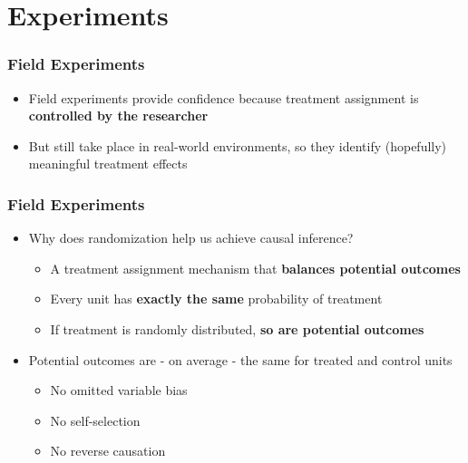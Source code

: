 \documentclass[xcolor=x11names,compress]{beamer}\usepackage[]{graphicx}\usepackage[]{color}
\renewcommand{\(}{\begin{columns}}
\renewcommand{\)}{\end{columns}}
\newcommand{\<}[1]{\begin{column}{#1}}
\renewcommand{\>}{\end{column}}
\begin{document}
\section{Experiments}

\begin{frame} 
\frametitle{Field Experiments}
\begin{itemize}
\item Field experiments provide confidence because treatment assignment is \textbf{controlled by the researcher}
\item But still take place in real-world environments, so they identify (hopefully) meaningful treatment effects
\end{itemize}
\end{frame}

\begin{frame}
\frametitle{Field Experiments}
\begin{itemize}
\item Why does randomization help us achieve causal inference?
\pause
\begin{itemize}
\item A treatment assignment mechanism that \textbf{balances potential outcomes}
\item Every unit has \textbf{exactly the same} probability of treatment
\item If treatment is randomly distributed, \textbf{so are potential outcomes}
\end{itemize}
\item Potential outcomes are - on average - the same for treated and control units
\begin{itemize}
\item No omitted variable bias
\item No self-selection
\item No reverse causation
\end{itemize}
\end{itemize}
\end{frame}
\end{document}
